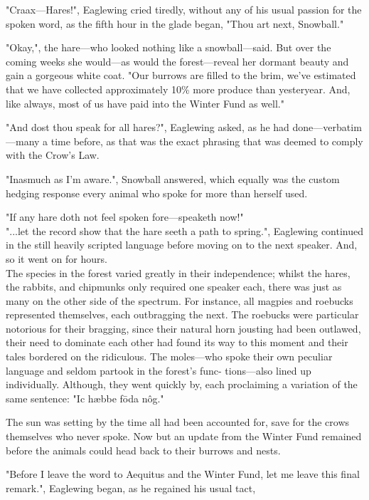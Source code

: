 "Craax---Hares!", Eaglewing cried tiredly, without any of his usual passion for the spoken word, as the fifth hour in the glade began, "Thou art next, Snowball."

"Okay,", the hare---who looked nothing like a snowball---said. But over the coming weeks she would---as would the forest---reveal her dormant beauty and gain a gorgeous white coat. "Our burrows are filled to the brim, we've estimated that we have collected approximately 10\% more produce than yesteryear. And, like always, most of us have paid into the Winter Fund as well."

"And dost thou speak for all hares?", Eaglewing asked, as he had done---verbatim---many a time before, as that was the exact phrasing that was deemed to comply with the Crow's Law.

"Inasmuch as I'm aware.", Snowball answered, which equally was the custom hedging response every animal who spoke for more than herself used.

"If any hare doth not feel spoken fore---speaketh now!"\\

"...let the record show that the hare seeth a path to spring.", Eaglewing continued in the still heavily scripted language before moving on to the next speaker. And, so it went on for hours.\\

The species in the forest varied greatly in their independence; whilst the hares, the rabbits, and chipmunks only required one speaker each, there was just as many on the other side of the spectrum. For instance, all magpies and roebucks represented themselves, each outbragging the next. The roebucks were particular notorious for their bragging, since their natural horn jousting had been outlawed, their need to dominate each other had found its way to this moment and their tales bordered on the ridiculous. The moles---who spoke their own peculiar language and seldom partook in the forest's func- tions---also lined up individually. Although, they went quickly by, each proclaiming a variation of the same sentence: "Ic hæbbe fōda nôg."

The sun was setting by the time all had been accounted for, save for the crows themselves who never spoke. Now but an update from the Winter Fund remained before the animals could head back to their burrows and nests.

"Before I leave the word to Aequitus and the Winter Fund, let me leave this final remark.", Eaglewing began, as he regained his usual tact,

